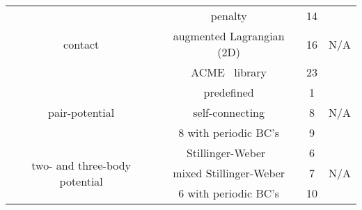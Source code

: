\begin{table}[h]
\begin{center}
\begin{tabular}[c]{|c|c|c|c|}
\multirow{3}{1.5in}{\centering contact} & penalty & 14& 
\multirow{3}{0.75in}{\centering N/A}\\
\hhline{~--~}
& augmented Lagrangian (2D) & 16 & \\
\hhline{~--~}
& \textsf{ACME}~\cite{ACME} library & 23 & \\
\hline
\multirow{3}{1.5in}{\centering pair-potential} & predefined & 1 &
\multirow{3}{0.75in}{\centering N/A}\\
\hhline{~--~}
& self-connecting & 8 & \\
\hhline{~--~}
& 8 with periodic BC's & 9 & \\
\hline
\multirow{3}{1.5in}{\centering two- and three-body potential} 
& Stillinger-Weber~\cite{Stillinger1985}  & 6 &
\multirow{3}{0.75in}{\centering N/A}\\
\hhline{~--~}
& mixed Stillinger-Weber & 7 & \\
\hhline{~--~}
& 6 with periodic BC's & 10 & \\
\hline
\end{tabular}
\end{center}
\end{table}

